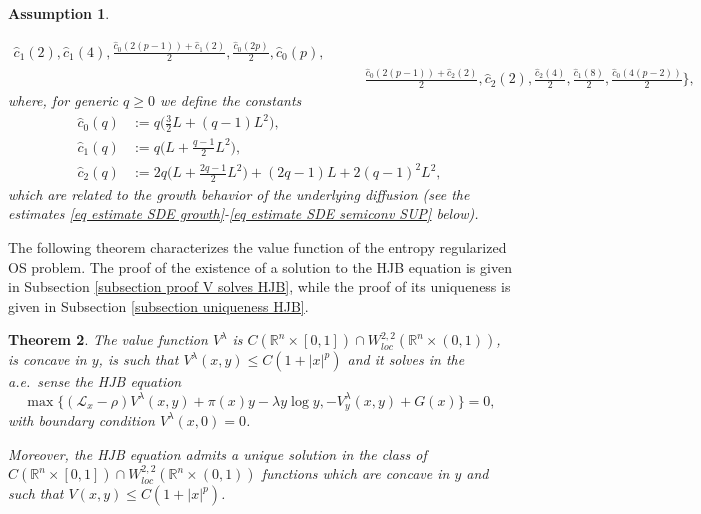 \documentclass[11pt]{amsart}
\newtheorem{theorem}{Theorem}[section]
\newtheorem{assumption}[theorem]{Assumption}
\theoremstyle{plain}
\def \R{\mathbb{R}}
\numberwithin{equation}{section}
\begin{document}
\begin{assumption}
\begin{enumerate}
$$\begin{aligned}
    \hat c _1(2), 
    {\hat c _1(4)} , 
    \frac{\hat c _0 ( 2(p-1))+ \hat c _1(2)}{2}, 
    \frac{\hat c _0(2p)}{2},
     \hat c _0 (p), \\
    & \qquad  \frac{\hat c _0 ( 2(p-1))+ \hat c _2(2)}{2}, 
    \hat c _2 (2),
    \frac{\hat c _2 (4)}2, 
    \frac{\hat c _1 (8)}{2}, 
    \frac{\hat c _0 ( 4(p-2))}{2} \Big\},
    \end{aligned}
    $$
    where, for generic $q \geq 0$ we define the constants
    \begin{equation}\label{eq definition constants}
    \begin{aligned}
        \hat c _0(q) &:= q \Big(\frac32 L + (q-1) L^2 \Big), \\
        \hat c _1(q) &:= q \Big(L+\frac{q-1}{2}L^2 \Big), \\
        \hat c _2 (q)& := {2 q\Big(L+\frac{2 q-1}{2} L^{2}\Big) }+ {(2 q-1) L+2(q-1)^{2} L^{2}}, 
    \end{aligned}
    \end{equation}
    which are related to the growth behavior of the underlying diffusion (see the estimates \eqref{eq estimate SDE growth}-\eqref{eq estimate SDE semiconv SUP} below).
    \end{enumerate}
\end{assumption}

The following theorem characterizes the value function of the entropy regularized OS problem.
The proof of the existence of a solution to the HJB equation is given in Subsection \ref{subsection proof V solves HJB}, while the proof of its uniqueness is given in Subsection \ref{subsection uniqueness HJB}.
\begin{theorem}\label{theorem value function}
The value function $V^\lambda$ is $C (\R^n \times [0,1]) \cap W_{loc}^{2, 2} \left(\mathbb{R}^{n} \times (0,1) \right)$, is concave in $y$, is such that $V^\lambda(x,y) \leq C (1+|x|^p)$ and it solves in the a.e.\ sense the HJB equation
$$
\max \big\{ \left(\mathcal{L}_{x} -\rho \right) V^\lambda(x, y) + \pi (x) y - \lambda y \log y, - V^\lambda_{y}(x, y) + G(x) \big\}=0, 
$$
with boundary condition $V^\lambda(x, 0)=0$.

{Moreover, the HJB equation admits a unique solution in the class of $ C (\R^n \times [0,1]) \cap W_{loc}^{2, 2} \left(\mathbb{R}^{n} \times (0,1) \right)$ functions which are concave in $y$ and such that $V(x,y) \leq C (1+|x|^p)$. 
}
\end{theorem}
\end{document}

